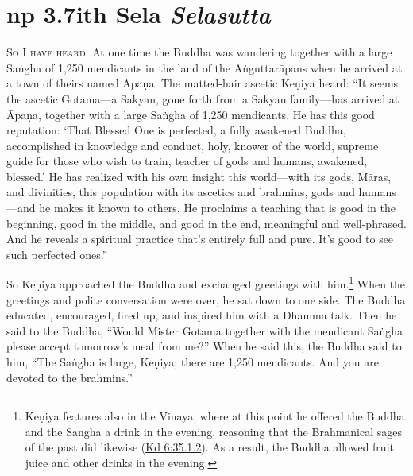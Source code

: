 \documentclass[12pt,openany]{book}%
\newcommand*{\suttatitleacronym}[1]{\smaller[2]{#1}\vspace*{.3em}}
\newcommand*{\suttatitletranslation}[1]{\linebreak{#1}}
\newcommand*{\suttatitleroot}[1]{\linebreak\smaller[2]\itshape{#1}}
\newcommand*{\tocacronym}[1]{\hspace*{-3.3em}{#1}\quad}
\newcommand*{\toctranslation}[1]{#1}
\newcommand*{\tocroot}[1]{(\textit{#1})}
\newcommand*{\scevam}[1]{\textsc{#1}}
\begin{document}
%
\section*{{\suttatitleacronym Snp 3.7}{\suttatitletranslation With Sela }{\suttatitleroot Selasutta}}
\addcontentsline{toc}{section}{\tocacronym{Snp 3.7} \toctranslation{With Sela } \tocroot{Selasutta}}

\scevam{So I have heard. }At one time the Buddha was wandering together with a large \textsanskrit{Saṅgha} of 1,250 mendicants in the land of the \textsanskrit{Aṅguttarāpans} when he arrived at a town of theirs named \textsanskrit{Āpaṇa}. The matted-hair ascetic \textsanskrit{Keṇiya} heard: “It seems the ascetic Gotama—a Sakyan, gone forth from a Sakyan family—has arrived at \textsanskrit{Āpaṇa}, together with a large \textsanskrit{Saṅgha} of 1,250 mendicants. He has this good reputation: ‘That Blessed One is perfected, a fully awakened Buddha, accomplished in knowledge and conduct, holy, knower of the world, supreme guide for those who wish to train, teacher of gods and humans, awakened, blessed.’ He has realized with his own insight this world—with its gods, \textsanskrit{Māras}, and divinities, this population with its ascetics and brahmins, gods and humans—and he makes it known to others. He proclaims a teaching that is good in the beginning, good in the middle, and good in the end, meaningful and well-phrased. And he reveals a spiritual practice that’s entirely full and pure. It’s good to see such perfected ones.” 

So \textsanskrit{Keṇiya} approached the Buddha and exchanged greetings with him.\footnote{\textsanskrit{Keṇiya} features also in the Vinaya, where at this point he offered the Buddha and the Sangha a drink in the evening, reasoning that the Brahmanical sages of the past did likewise (\href{https://suttacentral.net/pli-tv-kd6/en/sujato\#35.1.2}{Kd 6:35.1.2}). As a result, the Buddha allowed fruit juice and other drinks in the evening. } When the greetings and polite conversation were over, he sat down to one side. The Buddha educated, encouraged, fired up, and inspired him with a Dhamma talk. Then he said to the Buddha, “Would Mister Gotama together with the mendicant \textsanskrit{Saṅgha} please accept tomorrow’s meal from me?” When he said this, the Buddha said to him, “The \textsanskrit{Saṅgha} is large, \textsanskrit{Keṇiya}; there are 1,250 mendicants. And you are devoted to the brahmins.” 
\end{document}
